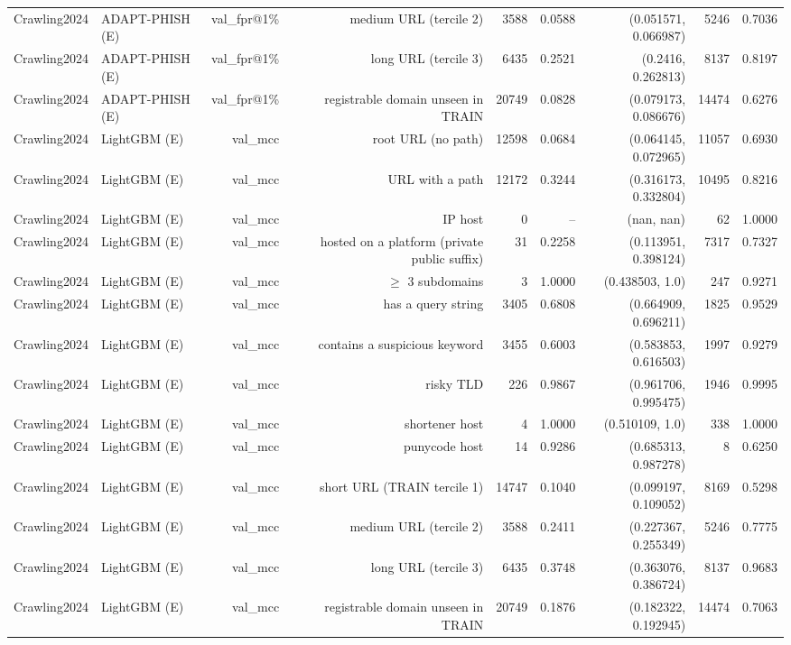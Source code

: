 \begin{table}[t]
\begin{tabular}{llrrrrrrr}
Crawling2024 & ADAPT-PHISH (E) & val\_fpr@1\% & medium URL (tercile 2) & 3588 & 0.0588 & (0.051571, 0.066987) & 5246 & 0.7036 \\
Crawling2024 & ADAPT-PHISH (E) & val\_fpr@1\% & long URL (tercile 3) & 6435 & 0.2521 & (0.2416, 0.262813) & 8137 & 0.8197 \\
Crawling2024 & ADAPT-PHISH (E) & val\_fpr@1\% & registrable domain unseen in TRAIN & 20749 & 0.0828 & (0.079173, 0.086676) & 14474 & 0.6276 \\
Crawling2024 & LightGBM (E) & val\_mcc & root URL (no path) & 12598 & 0.0684 & (0.064145, 0.072965) & 11057 & 0.6930 \\
Crawling2024 & LightGBM (E) & val\_mcc & URL with a path & 12172 & 0.3244 & (0.316173, 0.332804) & 10495 & 0.8216 \\
Crawling2024 & LightGBM (E) & val\_mcc & IP host & 0 & -- & (nan, nan) & 62 & 1.0000 \\
Crawling2024 & LightGBM (E) & val\_mcc & hosted on a platform (private public suffix) & 31 & 0.2258 & (0.113951, 0.398124) & 7317 & 0.7327 \\
Crawling2024 & LightGBM (E) & val\_mcc & $\geq$ 3 subdomains & 3 & 1.0000 & (0.438503, 1.0) & 247 & 0.9271 \\
Crawling2024 & LightGBM (E) & val\_mcc & has a query string & 3405 & 0.6808 & (0.664909, 0.696211) & 1825 & 0.9529 \\
Crawling2024 & LightGBM (E) & val\_mcc & contains a suspicious keyword & 3455 & 0.6003 & (0.583853, 0.616503) & 1997 & 0.9279 \\
Crawling2024 & LightGBM (E) & val\_mcc & risky TLD & 226 & 0.9867 & (0.961706, 0.995475) & 1946 & 0.9995 \\
Crawling2024 & LightGBM (E) & val\_mcc & shortener host & 4 & 1.0000 & (0.510109, 1.0) & 338 & 1.0000 \\
Crawling2024 & LightGBM (E) & val\_mcc & punycode host & 14 & 0.9286 & (0.685313, 0.987278) & 8 & 0.6250 \\
Crawling2024 & LightGBM (E) & val\_mcc & short URL (TRAIN tercile 1) & 14747 & 0.1040 & (0.099197, 0.109052) & 8169 & 0.5298 \\
Crawling2024 & LightGBM (E) & val\_mcc & medium URL (tercile 2) & 3588 & 0.2411 & (0.227367, 0.255349) & 5246 & 0.7775 \\
Crawling2024 & LightGBM (E) & val\_mcc & long URL (tercile 3) & 6435 & 0.3748 & (0.363076, 0.386724) & 8137 & 0.9683 \\
Crawling2024 & LightGBM (E) & val\_mcc & registrable domain unseen in TRAIN & 20749 & 0.1876 & (0.182322, 0.192945) & 14474 & 0.7063 \\

\end{tabular}
\end{table}
